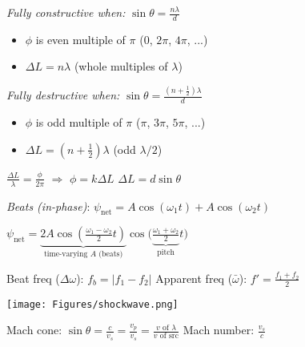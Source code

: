 \documentclass[twocolumn]{article}
\begin{document}
\textit{Fully constructive when:} $\sin \theta = \frac{n \lambda}{d}$
\begin{itemize}
    \item $\phi$ is even multiple of $\pi$ \hspace{4em} (0, $2\pi$, $4\pi$, ...)
    \item $\Delta L = n \lambda$ \hspace{9.8em} (whole multiples of $\lambda$)
\end{itemize}

\textit{Fully destructive when:} $\sin \theta = \frac{\left( n + \frac{1}{2} \right) \lambda}{d}$
\begin{itemize}
    \item $\phi$ is odd multiple of $\pi$ \hspace{4.25em} ($\pi$, $3\pi$, $5\pi$, ...)
    \item $\Delta L = \left( n + \frac{1}{2} \right) \lambda$ \hspace{6.8em} (odd $\lambda / 2$)
\end{itemize}

$\frac{\Delta L}{\lambda} = \frac{\phi}{2 \pi}$ \hspace{1em} $\Rightarrow$ \hspace{1em} $\phi = k \Delta L$ \hfill $\Delta L = d \sin \theta$

\textit{Beats (in-phase)}: $\psi_{\text{net}} = A \cos(\omega_1 t) + A \cos(\omega_2 t)$ \vspace{-1em}

\begin{center}
    $\psi_{\text{net}} = \underbrace{2 A \cos \left( \frac{\omega_1 - \omega_2}{2} t \right)}_{\text{time-varying $A$ (beats)}} \cos \Big( \underbrace{\frac{\omega_1 + \omega_2}{2}}_{\text{pitch}} t \Big)$
\end{center}

\vspace{-1em}

Beat freq ($\Delta \omega$): $f_b = | f_1 - f_2 |$ \hfill Apparent freq ($\bar{\omega}$): $f' = \frac{f_1 + f_2}{2}$

\centering \texttt{[image: Figures/shockwave.png]} \flushleft \vspace{-1em}

Mach cone: $\sin \theta = \frac{c}{v_s} = \frac{v_p}{v_s} = \frac{v \text{ of } \lambda}{v \text{ of src}}$ \hfill Mach number: $\frac{v_s}{c}$

\vspace{-.5em}
\end{document}

